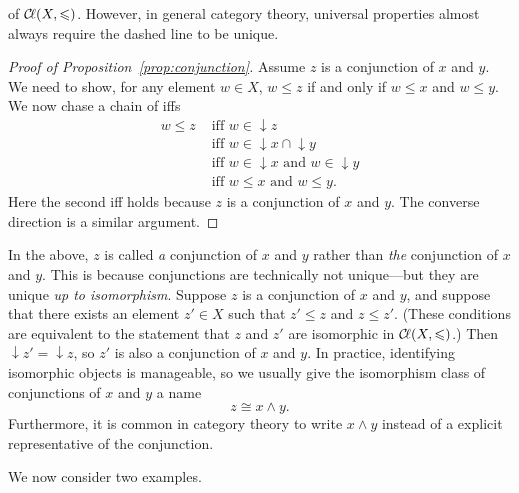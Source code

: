 \documentclass{../thesis-note}
\DeclareMathOperator\dset{\downarrow}
\begin{document}
of \({\mathcal{C}\kern-.15em\ell}{\left(X,\leqslant\right)}\). However, in general category theory, universal
properties almost always require the dashed line to be unique.
\begin{proof}[Proof of Proposition~\ref{prop:conjunction}]
  Assume \(z\) is a conjunction of \(x\) and \(y\). We need to show, for any
  element \(w \in X\), \(w \leq z\) if and only if \(w \leq x\) and \(w \leq
  y\). We now chase a chain of iffs
  \begin{align*}
    w \leq z &\text{ iff } w \in \dset z\\
    &\text{ iff } w \in \dset x \cap \dset y\\
    &\text{ iff } w \in \dset x \text{ and } w \in \dset y\\
    &\text{ iff } w \leq x \text{ and } w \leq y.
  \end{align*}
  Here the second iff holds because \(z\) is a conjunction of \(x\) and
  \(y\). The converse direction is a similar argument.
\end{proof}
\begin{remark}
  In the above, \(z\) is called \emph{a} conjunction of \(x\) and \(y\) rather
  than \emph{the} conjunction of \(x\) and \(y\). This is because conjunctions
  are technically not unique---but they are unique \emph{up to
    isomorphism}. Suppose \(z\) is a conjunction of \(x\) and \(y\), and suppose
  that there exists an element \(z' \in X\) such that \(z' \leq z\) and
  \(z \leq z'\). (These conditions are equivalent to the statement that \(z\)
  and \(z'\) are isomorphic in \({\mathcal{C}\kern-.15em\ell}{\left(X,\leqslant\right)}\).) Then \(\dset z' = \dset
  z\), so \(z'\) is also a conjunction of \(x\) and \(y\). In practice,
  identifying isomorphic objects is manageable, so we usually give the
  isomorphism class of conjunctions of \(x\) and \(y\) a name
  \[%
    z \cong x \wedge y.
  \]%
  Furthermore, it is common in category theory to write \(x \wedge y\) instead
  of a explicit representative of the conjunction.
\end{remark}
We now consider two examples.
\end{document}
